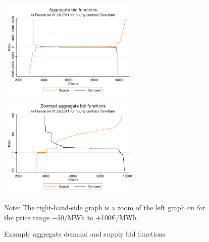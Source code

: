 \begin{figure}[!ht]
\begin{center} \includegraphics[height=50mm]{figch2/aggbidfuncnozoom.pdf} \hspace{0.05cm}\includegraphics[height=50mm]{figch2/aggbidfuncwithzoom.pdf} \end{center}
\caption{Example aggregate demand and supply bid functions}
\label{examplebidfunc}
{\small Note: The right-hand-side graph is a zoom of the left graph on for the price range  $-50$\EUR{}/MWh  to +100\euro /MWh.}
\end{figure}


